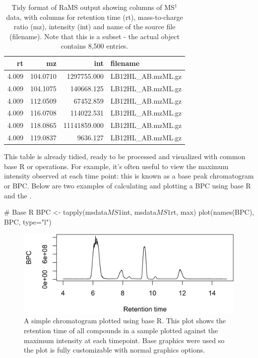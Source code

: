 \begin{table}[h]
    \centering
    \begin{tabular}{r|r|r|l}
        \hline
        rt & mz & int & filename\\
        \hline
        4.009 & 104.0710 & 1297755.000 & LB12HL\_AB.mzML.gz\\
        \hline
        4.009 & 104.1075 & 140668.125 & LB12HL\_AB.mzML.gz\\
        \hline
        4.009 & 112.0509 & 67452.859 & LB12HL\_AB.mzML.gz\\
        \hline
        4.009 & 116.0708 & 114022.531 & LB12HL\_AB.mzML.gz\\
        \hline
        4.009 & 118.0865 & 11141859.000 & LB12HL\_AB.mzML.gz\\
        \hline
        4.009 & 119.0837 & 9636.127 & LB12HL\_AB.mzML.gz\\
        \hline
    \end{tabular}
    \caption{Tidy format of RaMS output showing columns of MS$^1$ data, with columns for retention time (rt), mass-to-charge ratio (mz), intensity (int) and name of the source file (filename). Note that this is a subset - the actual object contains 8,500 entries.}
    \label{tab:MS1demo}
\end{table}

This table is already tidied, ready to be processed and visualized with common base R or  operations. For example, it's often useful to view the maximum intensity observed at each time point: this is known as a base peak chromatogram or BPC. Below are two examples of calculating and plotting a BPC using base R and the .

\begin{example}
    # Base R
    BPC <- tapply(msdata$MS1$int, msdata$MS1$rt, max)
    plot(names(BPC), BPC, type="l")
\end{example}

\begin{figure}[ht]
    \includegraphics[]{baseRchrom.png}
    \caption{A simple chromatogram plotted using base R. This plot shows the retention time of all compounds in a sample plotted against the maximum intensity at each timepoint. Base graphics were used so the plot is fully customizable with normal graphics options.}
    \label{fig:baseRchrom}
\end{figure}

